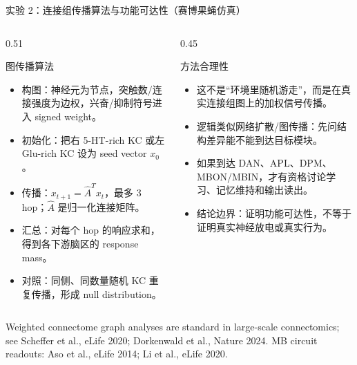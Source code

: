 \documentclass[aspectratio=169,10pt,fontset=none]{ctexbeamer}
\newcommand{\refs}[1]{\vfill{\tiny\textcolor{FlyDark}{#1}}}
\begin{document}
\begin{frame}{实验 2：连接组传播算法与功能可达性（赛博果蝇仿真）}
\small
\begin{columns}[T,onlytextwidth]
  \begin{column}{0.51\textwidth}
    \begin{block}{图传播算法}
      \begin{itemize}
        \item 构图：神经元为节点，突触数/连接强度为边权，兴奋/抑制符号进入 signed weight。
        \item 初始化：把右 5-HT-rich KC 或左 Glu-rich KC 设为 seed vector $x_0$。
        \item 传播：$x_{t+1}=\hat{A}^{T}x_t$，最多 3 hop；$\hat{A}$ 是归一化连接矩阵。
        \item 汇总：对每个 hop 的响应求和，得到各下游脑区的 response mass。
        \item 对照：同侧、同数量随机 KC 重复传播，形成 null distribution。
      \end{itemize}
    \end{block}
  \end{column}
  \begin{column}{0.45\textwidth}
    \begin{block}{方法合理性}
      \begin{itemize}
        \item 这不是“环境里随机游走”，而是在真实连接组图上的加权信号传播。
        \item 逻辑类似网络扩散/图传播：先问结构差异能不能到达目标模块。
        \item 如果到达 DAN、APL、DPM、MBON/MBIN，才有资格讨论学习、记忆维持和输出读出。
        \item 结论边界：证明功能可达性，不等于证明真实神经放电或真实行为。
      \end{itemize}
    \end{block}
  \end{column}
\end{columns}
\refs{Weighted connectome graph analyses are standard in large-scale connectomics; see Scheffer et al., eLife 2020; Dorkenwald et al., Nature 2024. MB circuit readouts: Aso et al., eLife 2014; Li et al., eLife 2020.}
\end{frame}
\end{document}
